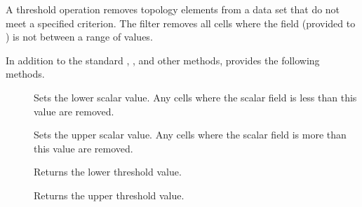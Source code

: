 
A threshold operation removes topology elements from a data set that do not
meet a specified criterion. The  filter removes all
cells where the field (provided to ) is not between a
range of values.

In addition to the standard ,
, and other methods,
 provides the following methods.

\begin{description}
\item[] Sets the lower scalar value. Any cells
  where the scalar field is less than this value are removed.
\item[] Sets the upper scalar value. Any cells
  where the scalar field is more than this value are removed.
\item[] Returns the lower threshold value.
\item[] Returns the upper threshold value.
\end{description}




